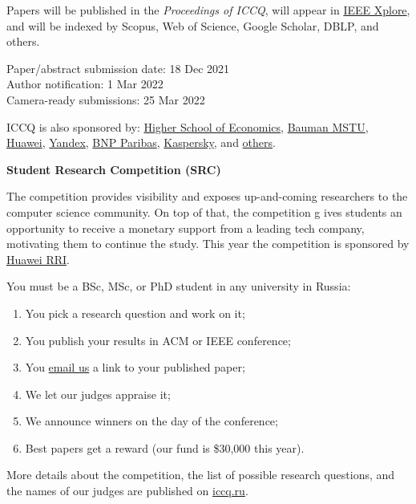 \documentclass{../cfp}
\begin{document}
Papers will be published in the \textit{Proceedings of ICCQ},
will appear in \href{https://ieeexplore.ieee.org/Xplore/home.jsp}{IEEE Xplore\textsuperscript{\textregistered}},
and will be indexed by Scopus, Web of Science, Google Scholar, DBLP, and others.

\begin{adjustwidth}{1.5in}{0pt}
\vspace{6pt}
Paper/abstract submission date: 18 Dec 2021 \\
Author notification: 1 Mar 2022 \\
Camera-ready submissions: 25 Mar 2022

\vspace{6pt}
ICCQ is also sponsored by:
\href{https://www.hse.ru/en/}{Higher School of Economics},
\href{https://bmstu.ru/en/}{Bauman MSTU},
\href{https://www.huawei.com/}{Huawei},
\href{https://yandex.com/company/}{Yandex},
\href{https://www.linkedin.com/company/btechrussia}{BNP Paribas},
\href{https://www.kaspersky.com/}{Kaspersky},
and \href{https://www.iccq.ru/2022.html#partners}{others}.
\end{adjustwidth}

\newpage

{\color{xred}\bfseries{\Large Student Research Competition (SRC)}}

The competition provides visibility and exposes up-and-coming
researchers to the computer science community. On top of that, the competition g
ives students an opportunity to receive a monetary support from a leading tech
company, motivating them to continue the study.
This year the competition is sponsored by \href{https://career.huawei.ru/rri/}{Huawei RRI}.

You must be a BSc, MSc, or PhD student in any university in Russia:

\begin{enumerate}
\item You pick a research question and work on it;
\item You publish your results in ACM or IEEE conference;
\item You \href{mailto:src@iccq.ru}{email us} a link to your published paper;
\item We let our judges appraise it;
\item We announce winners on the day of the conference;
\item Best papers get a reward (our fund is \$30,000 this year).
\end{enumerate}

More details about the competition, the list of possible research questions,
and the names of our judges are published on \href{https://www.iccq.ru}{iccq.ru}.

\end{document}
